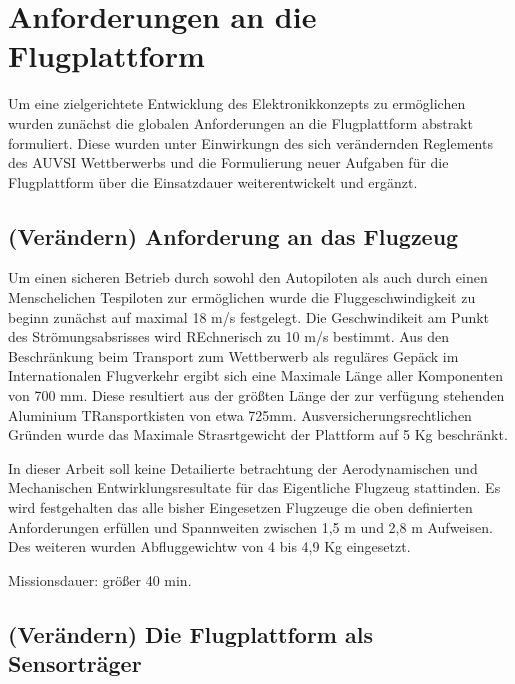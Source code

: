 \chapter{Anforderungen an die Flugplattform}\label{cha:Anforderungen an die Flugplattform}

Um eine zielgerichtete Entwicklung des Elektronikkonzepts zu ermöglichen wurden zunächst die globalen Anforderungen an die Flugplattform abstrakt formuliert. Diese wurden unter Einwirkungn des sich verändernden Reglements des AUVSI Wettberwerbs und die Formulierung neuer Aufgaben für die Flugplattform über die Einsatzdauer weiterentwickelt und ergänzt.  


\section{(Verändern) Anforderung an das Flugzeug}

Um einen sicheren Betrieb durch sowohl den Autopiloten als auch durch einen Menschelichen Tespiloten zur ermöglichen
wurde die Fluggeschwindigkeit zu beginn zunächst auf maximal 18 m/s festgelegt. Die Geschwindikeit am Punkt des Strömungsabsrisses wird REchnerisch zu 10 m/s bestimmt.
Aus den Beschränkung beim Transport zum Wettberwerb als reguläres Gepäck im Internationalen Flugverkehr ergibt sich eine Maximale Länge aller Komponenten von 700 mm. Diese resultiert aus der größten Länge der zur verfügung stehenden Aluminium
TRansportkisten von etwa 725mm.
Ausversicherungsrechtlichen Gründen wurde das Maximale Strasrtgewicht der Plattform auf 5 Kg beschränkt.

In dieser Arbeit soll keine Detailierte betrachtung der Aerodynamischen und Mechanischen Entwirklungsresultate für das Eigentliche Flugzeug stattinden. Es wird festgehalten das alle bisher Eingesetzen Flugzeuge die oben definierten Anforderungen erfüllen und Spannweiten zwischen 1,5 m und 2,8 m Aufweisen. Des weiteren wurden Abfluggewichtw von 4 bis 4,9 Kg eingesetzt.

Missionsdauer: größer 40 min.

\section{(Verändern) Die Flugplattform als Sensorträger}

